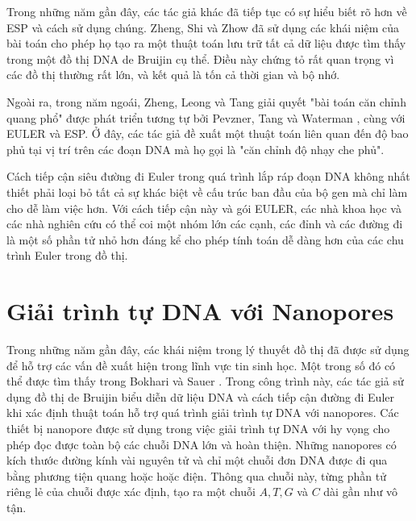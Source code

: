 \documentclass[14pt, a4paper]{article}
\numberwithin{equation}{section}
\numberwithin{figure}{section}
\numberwithin{dl}{section}
\numberwithin{md}{section}
\numberwithin{bd}{section}
\numberwithin{dn}{section}
\numberwithin{hq}{section}
\begin{document}
    Trong những năm gần đây, các tác giả khác đã tiếp tục có sự hiểu biết rõ hơn về ESP và cách sử dụng chúng.
    Zheng, Shi và Zhow \cite{zheng2004parallel} đã sử dụng các khái niệm của bài toán cho phép họ tạo ra một thuật toán lưu trữ tất cả dữ liệu được tìm thấy trong một đồ thị DNA de Bruijin cụ thể.
    Điều này chứng tỏ rất quan trọng vì các đồ thị thường rất lớn, và kết quả là tốn cả thời gian và bộ nhớ.

    Ngoài ra, trong năm ngoái, Zheng, Leong và Tang \cite{zhengimproved} giải quyết "bài toán căn chỉnh quang phổ" được phát triển tương tự bởi Pevzner, Tang và Waterman \cite{pevzner2001eulerian}, \cite{pevzner2001new} cùng với EULER và ESP.
    Ở đây, các tác giả đề xuất một thuật toán liên quan đến độ bao phủ tại vị trí trên các đoạn DNA mà họ gọi là "căn chỉnh độ nhạy che phủ".

    Cách tiếp cận siêu đường đi Euler trong quá trình lắp ráp đoạn DNA không nhất thiết phải loại bỏ tất cả sự khác biệt về cấu trúc ban đầu của bộ gen mà chỉ làm cho dễ làm việc hơn.
    Với cách tiếp cận này và gói EULER, các nhà khoa học và các nhà nghiên cứu có thể coi một nhóm lớn các cạnh, các đỉnh và các đường đi là một số phần tử nhỏ hơn đáng kể cho phép tính toán dễ dàng hơn của các chu trình Euler trong đồ thị.

    \section{Giải trình tự DNA với Nanopores}

    Trong những năm gần đây, các khái niệm trong lý thuyết đồ thị đã được sử dụng để hỗ trợ các vấn đề xuất hiện trong lĩnh vực tin sinh học.
    Một trong số đó có thể được tìm thấy trong Bokhari và Sauer \cite{bokhari2005parallel}.
    Trong công trình này, các tác giả sử dụng đồ thị de Bruijin biểu diễn dữ liệu DNA và cách tiếp cận đường đi Euler khi xác định thuật toán hỗ trợ quá trình giải trình tự DNA với nanopores.
    Các thiết bị nanopore được sử dụng trong việc giải trình tự DNA với hy vọng cho phép đọc được toàn bộ các chuỗi DNA lớn và hoàn thiện.
    Những nanopores có kích thước đường kính vài nguyên tử và chỉ một chuỗi đơn DNA được đi qua bằng phương tiện quang hoặc hoặc điện.
    Thông qua chuỗi này, từng phần tử riêng lẻ của chuỗi được xác định, tạo ra một chuỗi $A, T, G$ và $C$ dài gần như vô tận.
    
\end{document}
